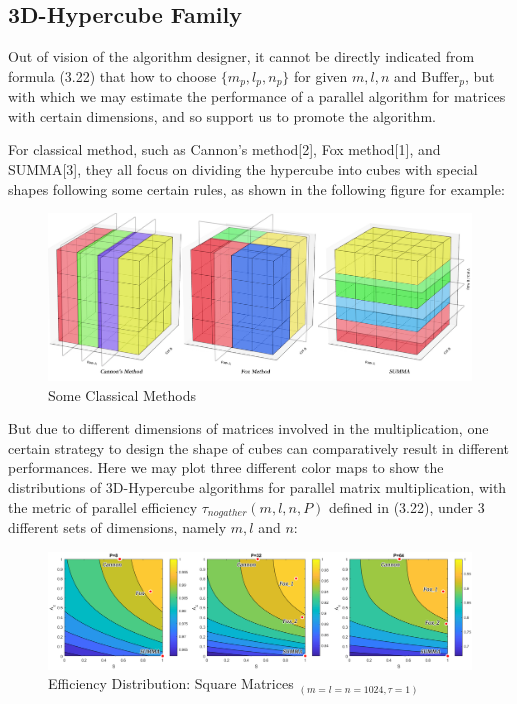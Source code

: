 \documentclass{amsart}
\theoremstyle{definition}
\theoremstyle{remark}
\numberwithin{equation}{section}
\begin{document}
\subsection{3D-Hypercube Family}
Out of vision of the algorithm designer, it cannot be directly indicated from formula (3.22) that how to choose $\{m_p,l_p,n_p\}$ for given $m,l,n$ and $\text{Buffer}_p$, but with which we may estimate the performance of a parallel algorithm for matrices with certain dimensions, and so support us to promote the algorithm.\par
For classical method, such as Cannon’s method[2], Fox method[1], and SUMMA[3], they all focus on dividing the hypercube into cubes with special shapes following some certain rules, as shown in the following figure for example:
\begin{figure}[h]
	\includegraphics[scale=0.2]{Figures/3DAlg.jpg}
	\caption{Some Classical Methods}
\end{figure}
\par
	But due to different dimensions of matrices involved in the multiplication, one certain strategy to design the shape of cubes can comparatively result in different performances. Here we may plot three different color maps to show the distributions of 3D-Hypercube algorithms for parallel matrix multiplication, with the metric of parallel efficiency $\tau_{no gather}(m,l,n,P)$ defined in (3.22), under 3 different sets of dimensions, namely $m,l$ and $n$:
\begin{figure}[h]
	\includegraphics[scale=0.35]{Figures/Regular.png}
	\caption{Efficiency Distribution: Square Matrices $_{(m=l=n=1024,\tau=1)}$}
\end{figure}
\end{document}
